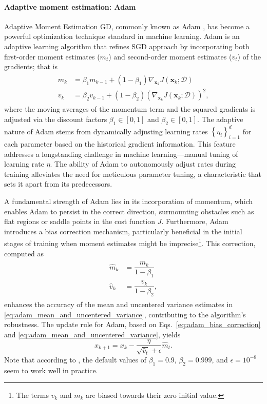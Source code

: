 \paragraph*{Adaptive moment estimation: Adam}
Adaptive Moment Estimation GD, commonly known as Adam \cite{Kingma2014Adammethodstochastic}, has become a powerful optimization technique standard in machine learning. Adam is an adaptive learning algorithm that refines SGD approach by incorporating both first-order moment estimates ($m_t$) and second-order moment estimates ($v_t$) of the gradients; that is
\begin{align}\label{eq:adam_mean_and_uncentered_variance}
	\begin{split} 
		m_k &= \beta_1 m_{k-1} + \left(1 - \beta_1 \right) \nabla_{\bm{x}_k} J(\bm{x}_k;\mathcal{D}) \\ 
		v_k &= \beta_2 v_{k-1} + \left(1 - \beta_2\right) \left( \nabla_{\bm{x}_k} J(\bm{x}_k;\mathcal{D}) \right)^2 ,
	\end{split}
\end{align}
where the moving averages of the momentum term and the squared gradients  is adjusted via the discount factors $\beta_1 \in [0,1]$ and $\beta_2 \in [0,1]$. The adaptive nature of Adam stems from dynamically adjusting learning rates $\left\lbrace \eta_i\right\rbrace^d_{i=1}$ for each parameter based on the historical gradient information. This feature addresses a longstanding challenge in machine learning---manual tuning of learning rate $\eta$. The ability of Adam to autonomously adjust rates during training alleviates the need for meticulous parameter tuning, a characteristic that sets it apart from its predecessors.

A fundamental strength of Adam lies in its incorporation of momentum, which enables Adam to persist in the correct direction, surmounting obstacles such as flat regions or saddle points in the cost function $J$. Furthermore, Adam introduces a bias correction mechanism, particularly beneficial in the initial stages of training when moment estimates might be imprecise\footnote{The terms $v_k$ and $m_k$ are biased towards their zero initial value.}. This correction, computed as
\begin{align}\label{eq:adam_bias_correction}
	\begin{split} 
		\hat{m}_k &= \dfrac{m_k}{1 - \beta_1} \\ 
		\hat{v}_k &= \dfrac{v_k}{1 - \beta_2},
	\end{split} 
\end{align}
enhances the accuracy of the mean and uncentered variance estimates in \eqref{eq:adam_mean_and_uncentered_variance}, contributing to the algorithm's robustness. The update rule for Adam, based on Eqs.~\eqref{eq:adam_bias_correction} and \eqref{eq:adam_mean_and_uncentered_variance}, yields
\begin{equation}
	x_{k+1} = x_{k} - \dfrac{\eta}{\sqrt{\hat{v}_t} + \epsilon} \hat{m}_t.
\end{equation}
Note that according to \cite{Kingma2014Adammethodstochastic}, the default values of $\beta_1 = 0.9$, $ \beta_2 = 0.999 $, and $\epsilon =10^{-8}$ seem to work well in practice.

